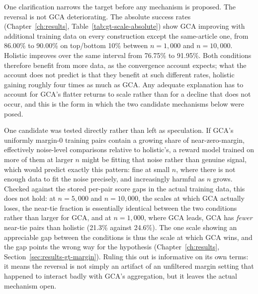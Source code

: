 One clarification narrows the target before any mechanism is proposed. The
reversal is not GCA deteriorating. The absolute success rates
(Chapter~\ref{ch:results}, Table~\ref{tab:gt-scale-absolute}) show GCA
improving with additional training data on every construction except the
same-article one, from 86.00\% to 90.00\% on top/bottom 10\% between
$n=1{,}000$ and $n=10{,}000$. Holistic improves over the same interval from
76.75\% to 91.95\%. Both conditions therefore benefit from more data, as the
convergence account expects; what the account does not predict is that they
benefit at such different rates, holistic gaining roughly four times as much
as GCA. Any adequate explanation has to account for GCA's flatter returns to
scale rather than for a decline that does not occur, and this is the form in
which the two candidate mechanisms below were posed.

One candidate was tested directly rather than left as speculation. If GCA's
uniformly margin-0 training pairs contain a growing share of near-zero-margin,
effectively noise-level comparisons relative to holistic's, a reward model
trained on more of them at larger $n$ might be fitting that noise rather than
genuine signal, which would predict exactly this pattern: fine at small $n$,
where there is not enough data to fit the noise precisely, and increasingly
harmful as $n$ grows. Checked against the stored per-pair score gaps in the
actual training data, this does not hold: at $n=5{,}000$ and $n=10{,}000$,
the scales at which GCA actually loses, the near-tie fraction is essentially
identical between the two conditions rather than larger for GCA, and at
$n=1{,}000$, where GCA leads, GCA has \emph{fewer} near-tie pairs than
holistic (21.3\% against 24.6\%). The one scale showing an appreciable gap
between the conditions is thus the scale at which GCA wins, and the gap
points the wrong way for the hypothesis
(Chapter~\ref{ch:results}, Section~\ref{sec:results-gt-margin}).
Ruling this out is informative on its own terms: it means the reversal is
not simply an artifact of an unfiltered margin setting that happened to
interact badly with GCA's aggregation, but it leaves the actual mechanism
open.

